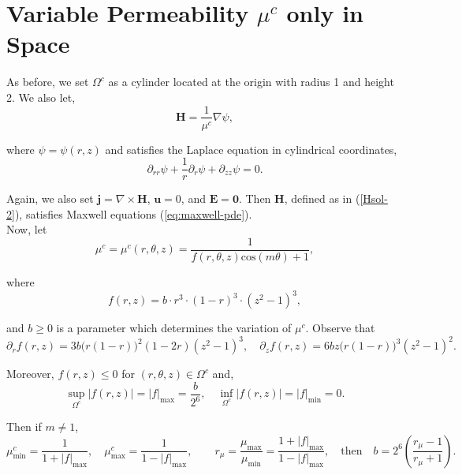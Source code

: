 \documentclass[11pt]{amsart}
\begin{document}
\newpage



\section{ Variable  Permeability ${\mu}^c$ only in Space}

As before, we set $\Omega^c$ as a cylinder located at the origin with radius 1 and height 2. We also let,
\begin{equation}
 \label{Hsol-2}
\mathbf{H}=\frac{1}{{\mu}^c} \nabla \psi,
\end{equation}

\noindent where $\psi=\psi(r,z)$ and satisfies the Laplace equation in cylindrical coordinates,
\begin{equation}
\label{eq:laplace_cyl2}
\partial _{rr}\psi + \frac{1}{r} \partial _r \psi + \partial_{zz} \psi = 0.
\end{equation}

\noindent Again, we also set  $\mathbf{j}= \nabla \times \mathbf{H}$, $\mathbf{u}=0$, and $\mathbf{E}=\mathbf{0}$. Then $\mathbf H$, defined as in (\ref{Hsol-2}),
satisfies Maxwell equations (\ref{eq:maxwell-pde}).\\

\noindent Now, let
\begin{equation}
{\mu^c}={\mu^c(r,\theta, z)}=\frac{1}{f(r,\theta,z)\text{cos}(m \theta )+1 },
\end{equation}

\noindent where $$f(r,z)= b \cdot r^3 \cdot (1-r)^3 \cdot (z^2-1)^3,$$
 
\noindent and  $b\geq 0 $ is a  parameter which determines the variation of ${\mu}^c$.
\noindent Observe that 
$$
\partial _r f(r,z) = 3b\big ( r(1-r)\big )^2(1-2r)(z^2-1)^3,
\quad
\partial _z f(r,z) = 6bz\big  (r(1-r))^3 (z^2-1)^2.
$$



Moreover,  $f (r,z) \leq 0$ for $(r,\theta,z) \in \Omega^c$ and,
$$
\sup _{\Omega^c} |f(r,z)|= |f|_{\text{max}}=\frac{b}{2^6}, \quad
\inf _{\Omega^c} |f(r,z)|= |f|_{\text{min}}=0.
$$

\noindent Then if $ m \neq 1$,
$$
\mu_{\text{min}} ^c = \frac{1}{1 + |f|_{\text{max}}},\quad   \mu_{\text{max}} ^c =\frac{1}{1 - |f|_{\text{max}}},
 \quad  \quad r_{\mu}=\frac{\mu _{\text{max}}}{\mu _{\text{min}}}=\frac{1 + |f|_{\text{max}}}{1 -  |f|_{\text{max}}}, \quad \text{then} \quad b= 2^6\left ( \frac{r_{\mu}-1}{r_{\mu}+1 }\right).
$$
\end{document}
